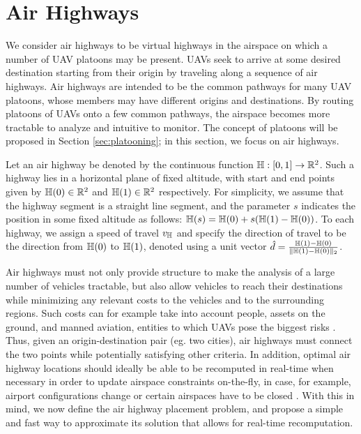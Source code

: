\section{Air Highways}
We consider air highways to be virtual highways in the airspace on which a number of UAV platoons may be present. UAVs seek to arrive at some desired destination starting from their origin by traveling along a sequence of air highways. Air highways are intended to be the common pathways for many UAV platoons, whose members may have different origins and destinations. By routing platoons of UAVs onto a few common pathways, the airspace becomes more tractable to analyze and intuitive to monitor. The concept of platoons will be proposed in Section \ref{sec:platooning}; in this section, we focus on air highways.

Let an air highway be denoted by the continuous function $\mathbb{H}: [0, 1] \rightarrow \mathbb{R}^2$. Such a highway lies in a horizontal plane of fixed altitude, with start and end points given by $\mathbb{H}(0)\in\mathbb{R}^2$ and $\mathbb{H}(1)\in\mathbb{R}^2$ respectively. For simplicity, we assume that the highway segment is a straight line segment, and the parameter $s$ indicates the position in some fixed altitude as follows: $\mathbb{H}(s) = \mathbb{H}(0) + s(\mathbb{H}(1) - \mathbb{H}(0))$. To each highway, we assign a speed of travel $v_{\mathbb{H}}$ and specify the direction of travel to be the direction from $\mathbb{H}(0)$ to $\mathbb{H}(1)$, denoted using a unit vector $\hat{d} = \frac{\mathbb{H}(1) - \mathbb{H}(0)}{\lVert\mathbb{H}(1) - \mathbb{H}(0)\rVert_2}$. 

Air highways must not only provide structure to make the analysis of a large number of vehicles tractable, but also allow vehicles to reach their destinations while minimizing any relevant costs to the vehicles and to the surrounding regions. Such costs can for example take into account people, assets on the ground, and manned aviation, entities to which UAVs pose the biggest risks \cite{Kopardekar16}. Thus, given an origin-destination pair (eg. two cities), air highways must connect the two points while potentially satisfying other criteria. In addition, optimal air highway locations should ideally be able to be recomputed in real-time when necessary in order to update airspace constraints on-the-fly, in case, for example, airport configurations change or certain airspaces have to be closed \cite{Kopardekar16}. With this in mind, we now define the air highway placement problem, and propose a simple and fast way to approximate its solution that allows for real-time recomputation. 

